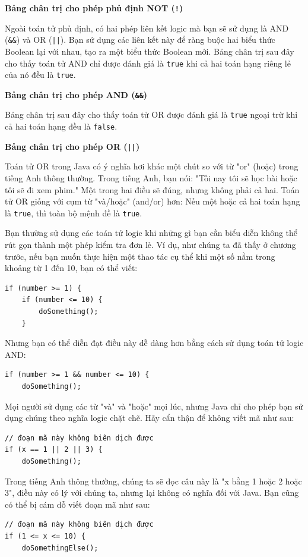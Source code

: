\noindent \textbf{Bảng chân trị cho phép phủ định NOT (\texttt{!})}

Ngoài toán tử phủ định, có hai phép liên kết logic mà bạn sẽ sử dụng là AND (\texttt{\&\&}) và OR (\texttt{||}). Bạn sử dụng các liên kết này để ràng buộc hai biểu thức Boolean lại với nhau, tạo ra một biểu thức Boolean mới. Bảng chân trị sau đây cho thấy toán tử AND chỉ được đánh giá là \texttt{true} khi cả hai toán hạng riêng lẻ của nó đều là \texttt{true}.

\noindent \textbf{Bảng chân trị cho phép AND (\texttt{\&\&})}

Bảng chân trị sau đây cho thấy toán tử OR được đánh giá là \texttt{true} ngoại trừ khi cả hai toán hạng đều là \texttt{false}.

\noindent \textbf{Bảng chân trị cho phép OR (\texttt{||})}

Toán tử OR trong Java có ý nghĩa hơi khác một chút so với từ "or" (hoặc) trong tiếng Anh thông thường. Trong tiếng Anh, bạn nói: "Tối nay tôi sẽ học bài hoặc tôi sẽ đi xem phim." Một trong hai điều sẽ đúng, nhưng không phải cả hai. Toán tử OR giống với cụm từ "và/hoặc" (and/or) hơn: Nếu một hoặc cả hai toán hạng là \texttt{true}, thì toàn bộ mệnh đề là \texttt{true}.

Bạn thường sử dụng các toán tử logic khi những gì bạn cần biểu diễn không thể rút gọn thành một phép kiểm tra đơn lẻ. Ví dụ, như chúng ta đã thấy ở chương trước, nếu bạn muốn thực hiện một thao tác cụ thể khi một số nằm trong khoảng từ 1 đến 10, bạn có thể viết:
\begin{verbatim}
if (number >= 1) {
    if (number <= 10) {
        doSomething();
    }
\end{verbatim}


Nhưng bạn có thể diễn đạt điều này dễ dàng hơn bằng cách sử dụng toán tử logic AND:
\begin{verbatim}
if (number >= 1 && number <= 10) {
    doSomething();
\end{verbatim}


Mọi người sử dụng các từ "và" và "hoặc" mọi lúc, nhưng Java chỉ cho phép bạn sử dụng chúng theo nghĩa logic chặt chẽ. Hãy cẩn thận để không viết mã như sau:
\begin{verbatim}
// đoạn mã này không biên dịch được
if (x == 1 || 2 || 3) {
    doSomething();
\end{verbatim}


Trong tiếng Anh thông thường, chúng ta sẽ đọc câu này là "x bằng 1 hoặc 2 hoặc 3", điều này có lý với chúng ta, nhưng lại không có nghĩa đối với Java. Bạn cũng có thể bị cám dỗ viết đoạn mã như sau:
\begin{verbatim}
// đoạn mã này không biên dịch được
if (1 <= x <= 10) {
    doSomethingElse();
\end{verbatim}


